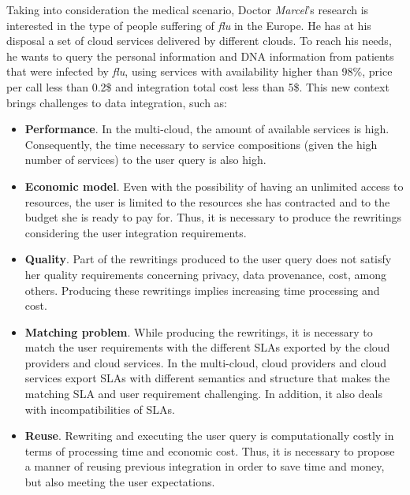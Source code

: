 Taking into consideration the medical scenario, Doctor \textit{Marcel}'s research is interested in the type of people suffering of \textit{flu} in the Europe. He has at his disposal a set of cloud services delivered by different clouds. To reach his needs, he wants to query the personal information and DNA information from patients that were infected by \textit{flu}, using services with availability higher than 98\%, price per call less than 0.2\$ and integration total cost less than 5\$. This new context brings challenges to data integration, such as:
\begin{itemize}
\item \textbf{Performance}. In the multi-cloud, the amount of available services is high. Consequently, the time necessary to service compositions (given the high number of services) to the user query is also high.
\item \textbf{Economic model}. Even with the possibility of having an unlimited access to resources, the user is limited to the resources she has contracted and to the budget she is ready to pay for. Thus, it is necessary to produce the rewritings considering the user integration requirements. 
\item \textbf{Quality}. Part of the rewritings produced to the user query does not satisfy her quality requirements concerning privacy, data provenance, cost, among others. Producing these rewritings implies increasing time processing and cost. 
\item \textbf{Matching problem}. While producing the rewritings, it is necessary to match the user requirements with the different SLAs exported by the cloud providers and cloud services. In the multi-cloud, cloud providers and cloud services export SLAs with different semantics and structure that makes the matching SLA and user requirement challenging. In addition, it also deals with incompatibilities of SLAs.
\item \textbf{Reuse}. Rewriting and executing the user query is computationally costly in terms of processing time and economic cost. Thus, it is necessary to propose a manner of reusing previous integration in order to save time and money, but also meeting the user expectations.
\end{itemize}

